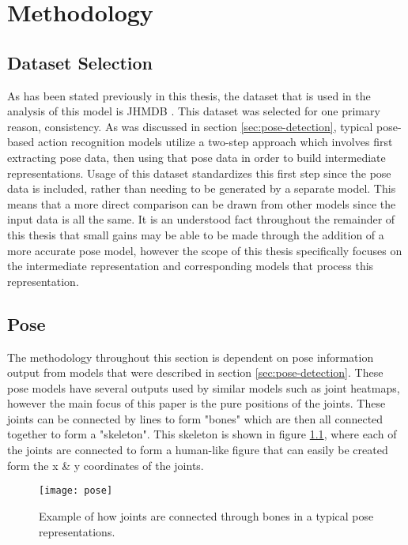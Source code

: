
\chapter{Methodology}

\label{Methodology}

\section{Dataset Selection}

As has been stated previously in this thesis, the dataset that is used in the analysis of this model is JHMDB \cite{JHMDB}. This dataset was selected for one primary reason, consistency. As was discussed in section \ref{sec:pose-detection}, typical pose-based action recognition models utilize a two-step approach which involves first extracting pose data, then using that pose data in order to build intermediate representations. Usage of this dataset standardizes this first step since the pose data is included, rather than needing to be generated by a separate model. This means that a more direct comparison can be drawn from other models since the input data is all the same. It is an understood fact throughout the remainder of this thesis that small gains may be able to be made through the addition of a more accurate pose model, however the scope of this thesis specifically focuses on the intermediate representation and corresponding models that process this representation.

\section{Pose}

The methodology throughout this section is dependent on pose information output from models that were described in section \ref{sec:pose-detection}. These pose models have several outputs used by similar models such as joint heatmaps, however the main focus of this paper is the pure positions of the joints. These joints can be connected by lines to form "bones" which are then all connected together to form a "skeleton". This skeleton is shown in figure \ref{fig:pose}, where each of the joints are connected to form a human-like figure that can easily be created form the x \& y coordinates of the joints.

\begin{figure}[ht]
	\texttt{[image: pose]}
	\centering
	\caption{Example of how joints are connected through bones in a typical pose representations.}
	\label{fig:pose}
\end{figure}

